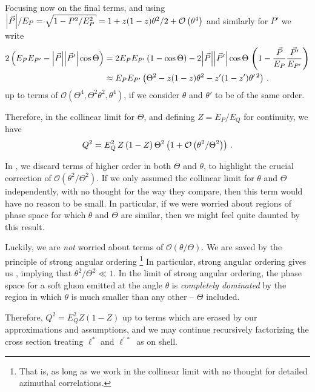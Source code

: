\begin{example}
    Focusing now on the final terms, and using \(\abs{\vec{P}} / E_P = \sqrt{1 - P^2 / E_P^2} = 1 + z(1-z)\theta^2/2 + \mathcal{O}\le(\theta^4\ri)\) and similarly for \(P'\) we write
    \begin{align}
        2 \left(
            E_P E_{P'}
            -
            \abs{\vec{P}}\abs{\vec{P}'}\cos\Theta
        \right)
        &=
        2 E_P E_{P'}\left(1 - \cos\Theta\right)
        -
        2\abs{\vec{P}}\abs{\vec{P}'}
        \cos\Theta
        \,
        \left(1 - \frac{\vec{P}}{E_P} \frac{\vec{P'}}{E_{P'}}\right)
        \\
        &\approx
        E_P E_{P'} \left(
            \Theta^2
            -
            z(1-z)\theta^2
            -
            z'(1-z')\theta^{\prime\,2}
        \right)
        \,.
    \end{align}
    up to terms of \(\mathcal{O}(\Theta^4, \Theta^2 \theta^2, \theta^4)\), if we consider \(\theta\) and \(\theta'\) to be of the same order.

    Therefore, in the collinear limit for \(\Theta\), and defining \(Z = E_P / E_Q\) for continuity, we have
    \begin{align}
        \label{eq:mass-strong-ordering}
        Q^2
        =
        E_Q^2
        \,
        Z \le(1-Z\ri) \Theta^2
        \le(
            1 + \mathcal{O}\le(\theta^2/\Theta^2\ri)
        \ri)
        \,.
    \end{align}

    In , we discard terms of higher order in both \(\Theta\) and \(\theta\), to highlight the crucial correction of \(\mathcal{O}(\theta^2/\Theta^2)\).
    If we only assumed the collinear limit for \(\theta\) and \(\Theta\) independently, with no thought for the way they compare, then this term would have no reason to be small.
    In particular, if we were worried about regions of phase space for which \(\theta\) and \(\Theta\) are similar, then we might feel quite daunted by this result.

    Luckily, we are \textit{not} worried about terms of \(\mathcal{O}(\theta/\Theta)\).
    We are saved by the principle of strong angular ordering%
    \footnote{
        That is, as long as we work in the collinear limit with no thought for detailed azimuthal correlations.
    }
    In particular, strong angular ordering gives us , implying that \(\theta^2 / \Theta^2 \ll 1\).
    In the limit of strong angular ordering, the phase space for a soft gluon emitted at the angle \(\theta\) is \textit{completely dominated} by the region in which \(\theta\) is much smaller than any other -- \(\Theta\) included.

    Therefore, \(Q^2 = E_Q^2 Z(1-Z)\) up to terms which are erased by our approximations and assumptions, and we may continue recursively factorizing the cross section treating \(\ell^*\) and \(\ell^{'\,*}\) as on shell.
\end{example}

